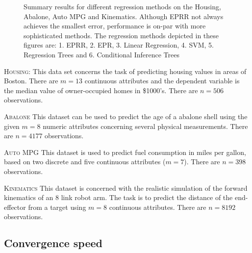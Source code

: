 \documentclass[preprint,authoryear,12pt]{elsarticle}
\begin{document}
\begin{description}
\begin{figure}[tb]
\begin{center}
\caption{Summary results for different regression methods on the Housing, Abalone, Auto MPG and Kinematics. Although \ac{EPRR} not always achieves the smallest error, performance is on-par with more sophisticated methods.  The regression methods depicted in these figures are: 1. \ac{EPRR}, 2. \ac{EPR}, 3. Linear Regression, 4. SVM, 5. Regression Trees and 6. Conditional Inference Trees}
\label{Housing_dataset_lambda0.8_25runs}
\label{Abalone_dataset_lambda0.8_25runs}
\label{Auto-Mpg_dataset_lambda0.8_25runs}
\label{Kinematics300_lambda0.8_25runs}
\end{center}\end{figure}

\item{\textsc{Housing}}: This data set concerns the task of predicting housing values in areas of Boston. There are $m=13$ continuous attributes and the dependent variable is the median value of owner-occupied homes in \$1000's. There are $n=506$ observations.


\item{\textsc{Abalone}} This dataset can be used to predict the age of a abalone shell using the given $m=8$ numeric attributes concerning several physical measurements. There are $n=4177$ observations. 


\item{\textsc{Auto MPG}} This dataset is used to predict fuel consumption in miles per gallon, based on two discrete and five continuous attributes ($m=7$). There are $n=398$ observations.


\item{\textsc{Kinematics}} This dataset is concerned with the realistic simulation of the forward kinematics of an 8 link robot arm. The task is to predict the distance of the end-effector from a target using $m=8$ continuous attributes. There are $n=8192$ observations. 


\end{description}

\subsection{Convergence speed}
\end{document}

